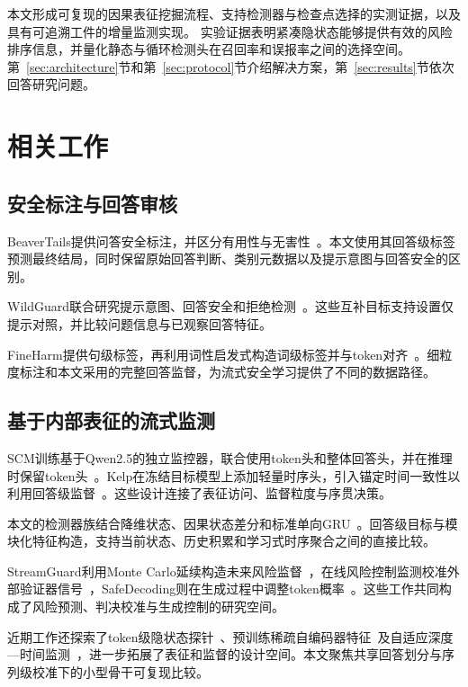 本文形成可复现的因果表征挖掘流程、支持检测器与检查点选择的实测证据，以及具有可追溯工件的增量监测实现。\AchievementScopeZH{} 实验证据表明紧凑隐状态能够提供有效的风险排序信息，并量化静态与循环检测头在召回率和误报率之间的选择空间。第~\ref{sec:architecture}节和第~\ref{sec:protocol}节介绍解决方案，第~\ref{sec:results}节依次回答研究问题。

\section{相关工作}
\subsection{安全标注与回答审核}
BeaverTails提供问答安全标注，并区分有用性与无害性~\cite{ji2023beavertails}。本文使用其回答级标签预测最终结局，同时保留原始回答判断、类别元数据以及提示意图与回答安全的区别。

WildGuard联合研究提示意图、回答安全和拒绝检测~\cite{han2024wildguard}。这些互补目标支持设置仅提示对照，并比较问题信息与已观察回答特征。

FineHarm提供句级标签，再利用词性启发式构造词级标签并与token对齐~\cite{NEURIPS2025_4e315702}。细粒度标注和本文采用的完整回答监督，为流式安全学习提供了不同的数据路径。

\subsection{基于内部表征的流式监测}
SCM训练基于Qwen2.5的独立监控器，联合使用token头和整体回答头，并在推理时保留token头~\cite{NEURIPS2025_4e315702}。Kelp在冻结目标模型上添加轻量时序头，引入锚定时间一致性以利用回答级监督~\cite{li2025kelpstreamingsafeguardlarge}。这些设计连接了表征访问、监督粒度与序贯决策。

本文的检测器族结合降维状态、因果状态差分和标准单向GRU~\cite{cho2014gru}。回答级目标与模块化特征构造，支持当前状态、历史积累和学习式时序聚合之间的直接比较。

StreamGuard利用Monte Carlo延续构造未来风险监督~\cite{kavumba2026streamguard}，在线风险控制监测校准外部验证器信号~\cite{schirmer2026online}，SafeDecoding则在生成过程中调整token概率~\cite{xu2024safedecoding}。这些工作共同构成了风险预测、判决校准与生成控制的研究空间。

近期工作还探索了token级隐状态探针~\cite{shu2026stopearly}、预训练稀疏自编码器特征~\cite{fang2026nextguard}及自适应深度—时间监测~\cite{wei2026adtguard}，进一步拓展了表征和监督的设计空间。本文聚焦共享回答划分与序列级校准下的小型骨干可复现比较。

